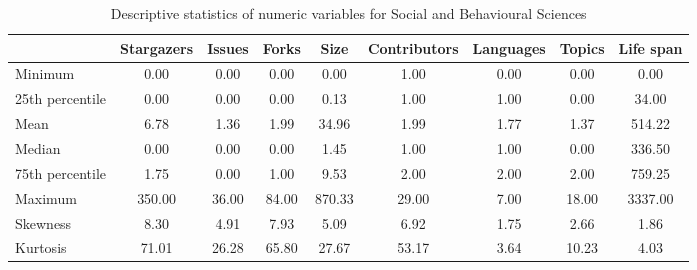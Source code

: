 \begin{table}
\centering
\caption{Descriptive statistics of numeric variables for Social and Behavioural Sciences}
\label{tab:Social_and_Behavioural_Sciences}
\begin{tabular}{lcccccccc}
\toprule
{} &  Stargazers &  Issues &  Forks &    Size &  Contributors &  Languages &  Topics &  Life span \\
\midrule
Minimum         &        0.00 &    0.00 &   0.00 &    0.00 &          1.00 &       0.00 &    0.00 &       0.00 \\
25th percentile &        0.00 &    0.00 &   0.00 &    0.13 &          1.00 &       1.00 &    0.00 &      34.00 \\
Mean            &        6.78 &    1.36 &   1.99 &   34.96 &          1.99 &       1.77 &    1.37 &     514.22 \\
Median          &        0.00 &    0.00 &   0.00 &    1.45 &          1.00 &       1.00 &    0.00 &     336.50 \\
75th percentile &        1.75 &    0.00 &   1.00 &    9.53 &          2.00 &       2.00 &    2.00 &     759.25 \\
Maximum         &      350.00 &   36.00 &  84.00 &  870.33 &         29.00 &       7.00 &   18.00 &    3337.00 \\
Skewness        &        8.30 &    4.91 &   7.93 &    5.09 &          6.92 &       1.75 &    2.66 &       1.86 \\
Kurtosis        &       71.01 &   26.28 &  65.80 &   27.67 &         53.17 &       3.64 &   10.23 &       4.03 \\
\bottomrule
\end{tabular}
\end{table}
